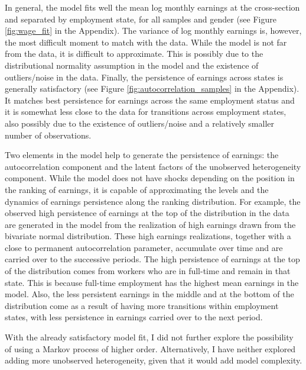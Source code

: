 \documentclass[12pt, a4paper]{article}
\begin{document}
In general, the model fits well the mean log monthly earnings at the cross-section and separated by employment state, for all samples and gender (see Figure \ref{fig:wage_fit} in the Appendix). The variance of log monthly earnings is, however, the most difficult moment to match with the data. While the model is not far from the data, it is difficult to approximate. This is possibly due to the distributional normality assumption in the model and the existence of outliers/noise in the data. Finally, the persistence of earnings across states is generally satisfactory (see Figure \ref{fig:autocorrelation_samples} in the Appendix). It matches best persistence for earnings across the same employment status and it is somewhat less close to the data for transitions across employment states, also possibly due to the existence of outliers/noise and a relatively smaller number of observations. 


Two elements in the model help to generate the persistence of earnings: the autocorrelation component and the latent factors of the unobserved heterogeneity component. While the model does not have shocks depending on the position in the ranking of earnings, it is capable of approximating the levels and the dynamics of earnings persistence along the ranking distribution. For example, the observed high persistence of earnings at the top of the distribution in the data are generated in the model from the realization of high earnings drawn from the bivariate normal distribution. These high earnings realizations, together with a close to permanent autocorrelation parameter,  accumulate over time and are carried over to the successive periods. The high persistence of earnings at the top of the distribution comes from workers who are in full-time and remain in that state. This is because full-time employment has the highest mean earnings in the model. Also, the less persistent earnings in the middle and at the bottom of the distribution come as a result of having more transitions within employment states, with less persistence in earnings carried over to the next period. 

With the already satisfactory model fit, I did not further explore the possibility of using a Markov process of higher order. Alternatively, I have neither explored adding more unobserved heterogeneity, given that it would add model complexity.

\end{document}
